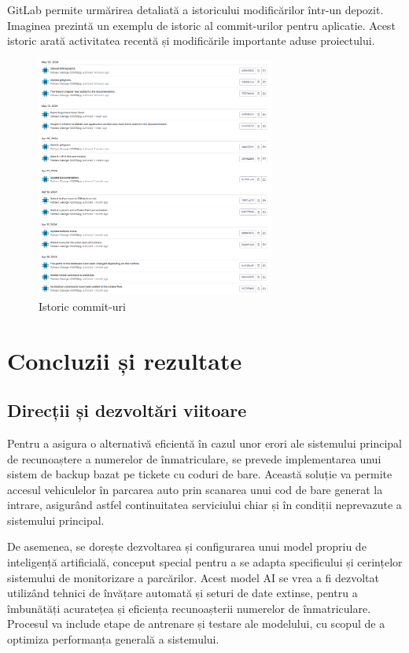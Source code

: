 \documentclass[a4paper,12pt]{report}
\begin{document}
GitLab permite urmărirea detaliată a istoricului modificărilor într-un depozit. Imaginea prezintă un exemplu de istoric al commit-urilor pentru aplicatie. Acest istoric arată activitatea recentă și modificările importante aduse proiectului.

\begin{figure}[h!]
    \centering
    \includegraphics[width=0.7\textwidth]{images/commits.jpg}
    \caption{Istoric commit-uri}
\end{figure}
\FloatBarrier

\chapter{Concluzii și rezultate}
\section{Direcții și dezvoltări viitoare}
Pentru a asigura o alternativă eficientă în cazul unor erori ale sistemului principal de recunoaștere a numerelor de înmatriculare, se prevede implementarea unui sistem de backup bazat pe tickete cu coduri de bare. Această soluție va permite accesul vehiculelor în parcarea auto prin scanarea unui cod de bare generat la intrare, asigurând astfel continuitatea serviciului chiar și în condiții neprevazute a sistemului principal.

De asemenea, se dorește dezvoltarea și configurarea unui model propriu de inteligență artificială, conceput special pentru a se adapta specificului și cerințelor sistemului de monitorizare a parcărilor. Acest model AI se vrea a fi dezvoltat utilizând tehnici de învățare automată și seturi de date extinse, pentru a îmbunătăți acuratețea și eficiența recunoașterii numerelor de înmatriculare. Procesul va include etape de antrenare și testare ale modelului, cu scopul de a optimiza performanța generală a sistemului.
\end{document}
